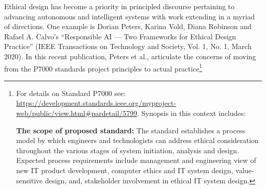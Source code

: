 \documentclass[11pt,dvipdfm]{article}
\begin{document}
Ethical design has become a priority in principled discourse pertaining to advancing autonomous and intelligent systems with work extending in a myriad of directions. One example is Dorian Peters, Karina Vold, Diana Robinson and Rafael A. Calvo’s ``Responsible AI --- Two Frameworks for Ethical Design Practice'' (IEEE Transactions on Technology and Society, Vol. 1, No. 1, March 2020).  In this recent publication, Peters et al., articulate the concerns of moving from the P7000 standards project principles to actual practice\footnote{For details on Standard P7000 see:  \url{https://development.standards.ieee.org/myproject-web/public/view.html\#pardetail/5799}.  Synopsis in this context includes: 
	
	\noindent \textbf{The scope of proposed standard:}  The standard establishes a process model by which engineers and technologists can address ethical consideration throughout the various stages of system initiation, analysis and design.  Expected process requirements include management and engineering view of new IT product development, computer ethics and IT system design, value-sensitive design, and, stakeholder involvement in ethical IT system design.  
	
}
\end{document}
